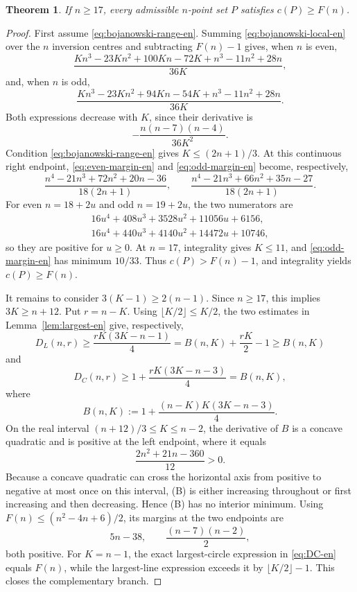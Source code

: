 \documentclass[11pt,a4paper]{article}
\newtheorem{theorem}{Theorem}[section]
\theoremstyle{definition}
\begin{document}
\begin{theorem}\label{thm:nge17-en}
If \(n\ge17\), every admissible \(n\)-point set \(P\) satisfies
\(c(P)\ge F(n)\).
\end{theorem}

\begin{proof}
First assume \eqref{eq:bojanowski-range-en}.  Summing
\eqref{eq:bojanowski-local-en} over the \(n\) inversion centres and subtracting
\(F(n)-1\) gives, when \(n\) is even,
\begin{equation}\label{eq:even-margin-en}
 \frac{Kn^3-23Kn^2+100Kn-72K+n^3-11n^2+28n}{36K},
\end{equation}
and, when \(n\) is odd,
\begin{equation}\label{eq:odd-margin-en}
 \frac{Kn^3-23Kn^2+94Kn-54K+n^3-11n^2+28n}{36K}.
\end{equation}
Both expressions decrease with \(K\), since their derivative is
\[
 -\frac{n(n-7)(n-4)}{36K^2}.
\]
Condition \eqref{eq:bojanowski-range-en} gives
\(K\le(2n+1)/3\).  At this continuous right endpoint,
\eqref{eq:even-margin-en} and \eqref{eq:odd-margin-en} become, respectively,
\[
 \frac{n^4-21n^3+72n^2+20n-36}{18(2n+1)},\qquad
 \frac{n^4-21n^3+66n^2+35n-27}{18(2n+1)}.
\]
For even \(n=18+2u\) and odd \(n=19+2u\), the two numerators are
\[
\begin{split}
16u^4+408u^3+3528u^2+11056u+6156,\\
16u^4+440u^3+4140u^2+14472u+10746,
\end{split}
\]
so they are positive for \(u\ge0\).  At \(n=17\), integrality gives
\(K\le11\), and \eqref{eq:odd-margin-en} has minimum \(10/33\).
Thus \(c(P)>F(n)-1\), and integrality yields \(c(P)\ge F(n)\).

It remains to consider \(3(K-1)\ge2(n-1)\).  Since \(n\ge17\), this implies
\(3K\ge n+12\).  Put \(r=n-K\).  Using
\(\lfloor K/2\rfloor\le K/2\), the two estimates in
Lemma~\ref{lem:largest-en} give, respectively,
\[
 D_L(n,r)\ge \frac{rK(3K-n-1)}4
     =B(n,K)+\frac{rK}{2}-1\ge B(n,K)
\]
and
\[
 D_C(n,r)\ge1+\frac{rK(3K-n-3)}4=B(n,K),
\]
where
\begin{equation}\label{eq:coarse-en}
 B(n,K):=1+\frac{(n-K)K(3K-n-3)}4.
\end{equation}
On the real interval \((n+12)/3\le K\le n-2\), the derivative of \(B\) is a
concave quadratic and is positive at the left endpoint, where it equals
\[
 \frac{2n^2+21n-360}{12}>0.
\]
Because a concave quadratic can cross the horizontal axis from positive to negative
at most once on this interval, (B) is either increasing throughout or first
increasing and then decreasing.  Hence (B) has no interior minimum.  Using
\(F(n)\le(n^2-4n+6)/2\), its margins at the two endpoints are
\[
 5n-38,\qquad \frac{(n-7)(n-2)}2,
\]
both positive.  For \(K=n-1\), the exact largest-circle expression in
\eqref{eq:DC-en} equals \(F(n)\), while the largest-line expression exceeds it
by \(\lfloor K/2\rfloor-1\).  This closes the complementary branch.
\end{proof}
\end{document}
